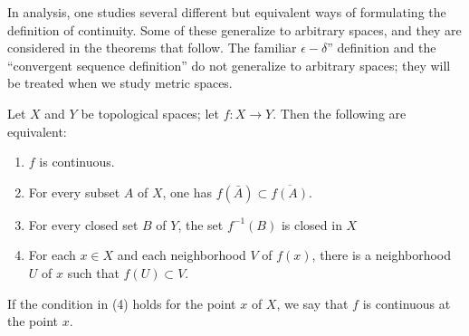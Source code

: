 In analysis, one studies several different but equivalent ways of formulating the definition of continuity. Some of these generalize to arbitrary spaces, and they are considered in the theorems that follow. The familiar \(\epsilon - \delta\)'' definition and the ``convergent sequence definition'' do not generalize to arbitrary spaces; they will be treated when we study metric spaces.

\begin{theorem}
\label{thm:\thetheorem}
 Let \(X\) and \(Y\) be topological spaces; let \(f : X \rightarrow Y\). Then the following are equivalent:

 \begin{enumerate}[itemsep=0.2em, parsep=0pt, topsep=0pt, partopsep=0pt, leftmargin=*, label=(\arabic*), align=left]
 \item \(f\) is continuous.
 \item For every subset \(A\) of \(X\), one has \(f( \bar{A}) \subset \overline{f( A) }\).
 \item For every closed set \(B\) of \(Y\), the set \(f^{-1}( B)\) is closed in \(X\)
 \item For each \(x \in X\) and each neighborhood \(V\) of \(f(x)\), there is a neighborhood \(U\) of \(x\) such that \(f( U) \subset V\).
 \end{enumerate}
\end{theorem}

If the condition in (4) holds for the point \(x\) of \(X\), we say that \(f\) is continuous at the point \(x\).

